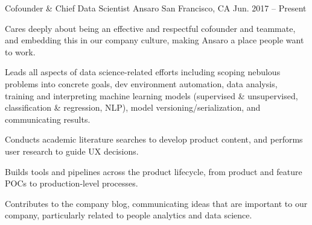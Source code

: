 
\begin{cventries}

  \cventry
    {Cofounder \& Chief Data Scientist} %
    {Ansaro} %
    {San Francisco, CA} %
    {Jun. 2017 -- Present} %
    {
      \begin{cvitems} %
        \item {Cares deeply about being an effective and respectful cofounder and teammate, and embedding this in our company culture, making Ansaro a place people want to work.}
        \item {Leads all aspects of data science-related efforts including scoping nebulous problems into concrete goals, dev environment automation, data analysis, training and interpreting machine learning models (supervised \& unsupervised, classification \& regression, NLP), model versioning/serialization, and communicating results.}
        \item {Conducts academic literature searches to develop product content, and performs user research to guide UX decisions.}
        \item {Builds tools and pipelines across the product lifecycle, from product and feature POCs to production-level processes.}
        \item {Contributes to the company blog, communicating ideas that are important to our company, particularly related to people analytics and data science.}
     \end{cvitems}
    }


\end{cventries}
